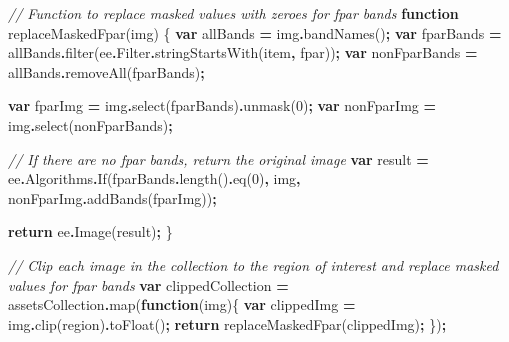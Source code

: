 \documentclass[
  10pt,
  b5paper,
  oneside]{book}
\newenvironment{Shaded}{\begin{snugshade}}{\end{snugshade}}
\newcommand{\AttributeTok}[1]{\textcolor[rgb]{0.77,0.63,0.00}{#1}}
\newcommand{\CommentTok}[1]{\textcolor[rgb]{0.56,0.35,0.01}{\textit{#1}}}
\newcommand{\ControlFlowTok}[1]{\textcolor[rgb]{0.13,0.29,0.53}{\textbf{#1}}}
\newcommand{\DecValTok}[1]{\textcolor[rgb]{0.00,0.00,0.81}{#1}}
\newcommand{\FunctionTok}[1]{\textcolor[rgb]{0.00,0.00,0.00}{#1}}
\newcommand{\KeywordTok}[1]{\textcolor[rgb]{0.13,0.29,0.53}{\textbf{#1}}}
\newcommand{\NormalTok}[1]{#1}
\newcommand{\OperatorTok}[1]{\textcolor[rgb]{0.81,0.36,0.00}{\textbf{#1}}}
\newcommand{\StringTok}[1]{\textcolor[rgb]{0.31,0.60,0.02}{#1}}
\begin{document}
\begin{Shaded}
\begin{Highlighting}[]
\CommentTok{// Function to replace masked values with zeroes for fpar bands}
\KeywordTok{function} \FunctionTok{replaceMaskedFpar}\NormalTok{(img) \{}
  \KeywordTok{var}\NormalTok{ allBands }\OperatorTok{=}\NormalTok{ img}\OperatorTok{.}\FunctionTok{bandNames}\NormalTok{()}\OperatorTok{;}
  \KeywordTok{var}\NormalTok{ fparBands }\OperatorTok{=}\NormalTok{ allBands}\OperatorTok{.}\FunctionTok{filter}\NormalTok{(ee}\OperatorTok{.}\AttributeTok{Filter}\OperatorTok{.}\FunctionTok{stringStartsWith}\NormalTok{(}\StringTok{\textquotesingle{}item\textquotesingle{}}\OperatorTok{,} \StringTok{\textquotesingle{}fpar\textquotesingle{}}\NormalTok{))}\OperatorTok{;}
  \KeywordTok{var}\NormalTok{ nonFparBands }\OperatorTok{=}\NormalTok{ allBands}\OperatorTok{.}\FunctionTok{removeAll}\NormalTok{(fparBands)}\OperatorTok{;}
  
  \KeywordTok{var}\NormalTok{ fparImg }\OperatorTok{=}\NormalTok{ img}\OperatorTok{.}\FunctionTok{select}\NormalTok{(fparBands)}\OperatorTok{.}\FunctionTok{unmask}\NormalTok{(}\DecValTok{0}\NormalTok{)}\OperatorTok{;}
  \KeywordTok{var}\NormalTok{ nonFparImg }\OperatorTok{=}\NormalTok{ img}\OperatorTok{.}\FunctionTok{select}\NormalTok{(nonFparBands)}\OperatorTok{;}
  
  \CommentTok{// If there are no fpar bands, return the original image}
  \KeywordTok{var}\NormalTok{ result }\OperatorTok{=}\NormalTok{ ee}\OperatorTok{.}\AttributeTok{Algorithms}\OperatorTok{.}\FunctionTok{If}\NormalTok{(fparBands}\OperatorTok{.}\FunctionTok{length}\NormalTok{()}\OperatorTok{.}\FunctionTok{eq}\NormalTok{(}\DecValTok{0}\NormalTok{)}\OperatorTok{,}
\NormalTok{                                 img}\OperatorTok{,}
\NormalTok{                                 nonFparImg}\OperatorTok{.}\FunctionTok{addBands}\NormalTok{(fparImg))}\OperatorTok{;}
  
  \ControlFlowTok{return}\NormalTok{ ee}\OperatorTok{.}\FunctionTok{Image}\NormalTok{(result)}\OperatorTok{;}
\NormalTok{\}}

\CommentTok{// Clip each image in the collection to the region of interest and replace masked values for fpar bands}
\KeywordTok{var}\NormalTok{ clippedCollection }\OperatorTok{=}\NormalTok{ assetsCollection}\OperatorTok{.}\FunctionTok{map}\NormalTok{(}\KeywordTok{function}\NormalTok{(img)\{}
  \KeywordTok{var}\NormalTok{ clippedImg }\OperatorTok{=}\NormalTok{ img}\OperatorTok{.}\FunctionTok{clip}\NormalTok{(region)}\OperatorTok{.}\FunctionTok{toFloat}\NormalTok{()}\OperatorTok{;}
  \ControlFlowTok{return} \FunctionTok{replaceMaskedFpar}\NormalTok{(clippedImg)}\OperatorTok{;}
\NormalTok{\})}\OperatorTok{;}


\end{Highlighting}
\end{Shaded}
\end{document}
